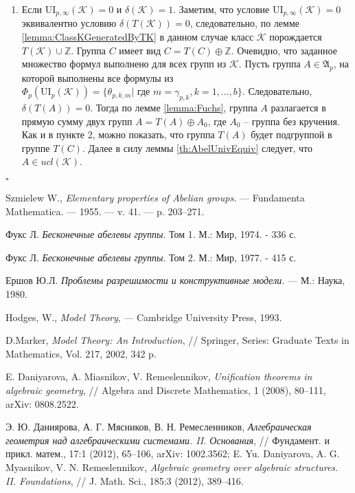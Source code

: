 \documentclass[a4paper,11pt,twoside]{article}
\newcommand{\todoi}[1]{\todo[inline]{#1}}
\def\A{{\mathfrak{A}}}
\def\K{{\mathcal{K}}}
\def\Z{{\mathbb{Z}}}
\def\ui{{\mathrm{UI}}}
\begin{document}
\begin{enumerate}
\item Если $\ui_{p, \infty}(\K) = 0$ и $\delta(\K) = 1$. Заметим, что условие $\ui_{p, \infty}(\K) = 0$ эквивалентно условию $\delta(T(\K)) = 0$, следовательно, по лемме \ref{lemma:ClassKGeneratedByTK} в данном случае класс $\K$ порождается $T(\K) \cup \Z$. Группа $C$ имеет вид $C = T(C) \oplus \Z$. Очевидно, что заданное множество формул выполнено для всех групп из $\K$. Пусть группа $A \in \A_p$, на которой выполнены все формулы из $\Phi_p(\ui_p(\K)) = \{\theta_{p,k,m} | \text{ где } m = \gamma_{p,k}, k = 1, \ldots, b\}.$ Следовательно, $\delta(T(A)) = 0$. Тогда по лемме \ref{lemma:Fuchs}, группа $A$ разлагается в прямую сумму двух групп $A = T(A) \oplus A_0$, где $A_0$ -- группа без кручения. Как и в пункте 2, можно показать, что группа $T(A)$ будет подгруппой в группе $T(C)$. Далее в силу леммы \ref{th:AbelUnivEquiv} следует, что $A \in ucl(\K)$.
\end{enumerate}

$\square$





\begin{thebibliography}{}

 Szmielew W., \textit{Elementary properties of Abelian groups.} — Fundamenta Mathematica. —
1955. — v. 41. — p. 203–271.

 Фукс Л. \textit{Бесконечные абелевы группы}. Том 1. М.: Мир, 1974. - 336 с.

 Фукс Л. \textit{Бесконечные абелевы группы}. Том 2. М.: Мир, 1977. - 415 с.

 Ершов Ю.Л. \textit{Проблемы разрешимости и конструктивные модели.} --- М.: Наука, 1980.

 Hodges, W., \textit{Model Theory}, --- Cambridge University Press, 1993. 

 D.Marker, \textit{Model Theory: An Introduction}, // Springer, Series: Graduate Texts in Mathematics, Vol. 217, 2002, 342 p.

 E. Daniyarova, A. Miasnikov, V. Remeslennikov, \textit{Unification theorems in algebraic geometry}, // Algebra and Discrete Mathematics, 1 (2008), 80--111, arXiv: 0808.2522.

 \todoi{Проверить ссылку} Э. Ю. Даниярова, А. Г. Мясников, В. Н. Ремесленников, \textit{Алгебраическая геометрия над алгебраическими системами. II. Основания}, // Фундамент. и прикл. матем., 17:1 (2012), 65--106, arXiv: 1002.3562; E. Yu. Daniyarova, A. G. Myasnikov, V. N. Remeslennikov, \textit{Algebraic geometry over algebraic structures. II. Foundations}, // J. Math. Sci., 185:3 (2012), 389--416.


\end{thebibliography}
\end{document}
